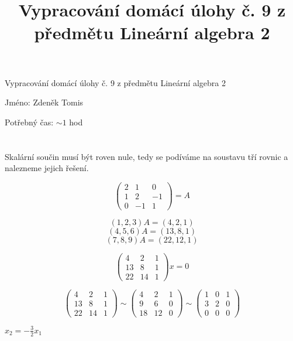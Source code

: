\documentclass[10pt,a4paper]{article}
\title{Vypracování domácí úlohy č. 9 z předmětu Lineární algebra 2}
\theoremstyle{plain}
\theoremstyle{definition}
\begin{document}
\begin{Large}
Vypracování domácí úlohy č. 9 z předmětu Lineární algebra 2
\end{Large}

\begin{large}
Jméno: Zdeněk Tomis
\end{large}

Potřebný čas: $\sim 1$  hod

\section{}

Skalární součin musí být roven nule, tedy se podíváme na soustavu tří rovnic a nalezneme jejich řešení.

\[\begin{pmatrix}
2 & 1 & 0 \\
1 & 2 &-1 \\
0 &-1 & 1
\end{pmatrix} = A\]

\begin{equation} (1,2,3)A = (4,2,1)  \end{equation}
\begin{equation} (4,5,6)A = (13,8,1)  \end{equation}
\begin{equation} (7,8,9)A = (22,12,1)  \end{equation}

\[ \begin{pmatrix}
4 & 2 & 1  \\
13 & 8 & 1 \\
22 & 14 & 1
\end{pmatrix}x = 0  \]

\[ \begin{pmatrix}
4 & 2 & 1  \\
13 & 8 & 1 \\
22 & 14 & 1
\end{pmatrix} \sim \begin{pmatrix}
4 & 2 & 1  \\
9 & 6 & 0 \\
18 & 12 & 0
\end{pmatrix} \sim \begin{pmatrix}
1 & 0 & 1  \\
3 & 2 & 0 \\
0 & 0 & 0
\end{pmatrix} \]

$x_2 = -\frac32x_1$
\end{document}
